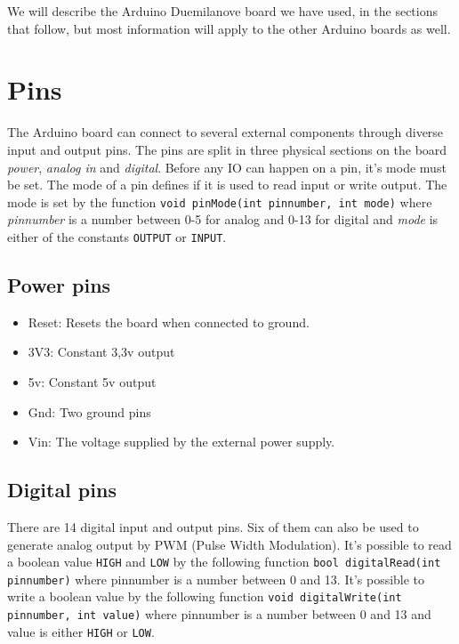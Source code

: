 \documentclass[a4paper, oneside, final]{memoir}
\begin{document}
We will describe the Arduino Duemilanove board we have used, in the
sections that follow, but most information will apply to
the other Arduino boards as well.

\section{Pins}
The Arduino board can connect to several external components through
diverse input and output pins. The pins are split in three physical sections on
the board \textit{power}, \textit{analog in} and
\textit{digital}. Before any IO can happen on a pin, it's mode must be
set. The mode of a pin defines if it is used to read input or
write output. The mode is set by the function \texttt{void pinMode(int
  pinnumber, int mode)} where \textit{pinnumber} is a number between
0-5 for analog and 0-13 for digital and \textit{mode} is either of the constants
\texttt{OUTPUT} or \texttt{INPUT}.

\subsection{Power pins}
\begin{itemize}
\item Reset: Resets the board when connected to ground.
\item 3V3: Constant 3,3v output
\item 5v: Constant 5v output
\item Gnd: Two ground pins
\item Vin: The voltage supplied by the external power supply.
\end{itemize}

\subsection{Digital pins}

There are 14 digital input and output pins. Six of them can also be
used to generate analog output by PWM (Pulse Width Modulation). It's
possible to read a boolean value \texttt{HIGH} and \texttt{LOW} by the
following function \texttt{bool digitalRead(int pinnumber)} where
pinnumber is a number between 0 and 13. It's possible to write a
boolean value by the following function \texttt{void digitalWrite(int
  pinnumber, int value)} where pinnumber is a number between 0 and 13
and value is either \texttt{HIGH} or \texttt{LOW}.
\end{document}
